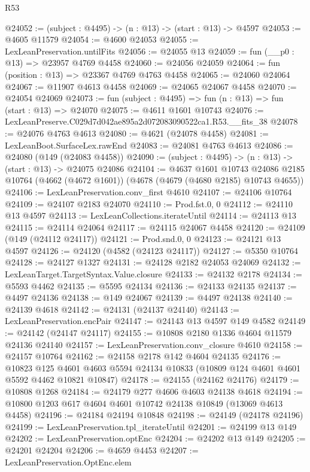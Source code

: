 \begin{lexlean}{R53}
\begin{coremodule}
@24052 := (subject : @4495) -> (n : @13) -> (start : @13) -> @4597
@24053 := @4605 @11579
@24054 := @4600 @24053
@24055 := LexLeanPreservation.untilFits
@24056 := @24055 @13
@24059 := fun (__p0 : @13) => @23957 @4769 @4458
@24060 := @24056 @24059
@24064 := fun (position : @13) => @23367 @4769 @4763 @4458
@24065 := @24060 @24064
@24067 := @11907 @4613 @4458
@24069 := @24065 @24067 @4458
@24070 := @24054 @24069
@24073 := fun (subject : @4495) => fun (n : @13) => fun (start : @13) => @24070
@24075 := @4611 @1601 @10743
@24076 := LexLeanPreserve.C029d7d042ae895a2d072083090522ca1.R53.__fits_38
@24078 := @24076 @4763 @4613
@24080 := @4621 (@24078 @4458)
@24081 := LexLeanBoot.SurfaceLex.rawEnd
@24083 := @24081 @4763 @4613
@24086 := @24080 (@149 (@24083 @4458))
@24090 := (subject : @4495) -> (n : @13) -> (start : @13) -> @24075 @24086
@24104 := @4637
    @1601
    @10743
    @24086
    @2185
    @10764
    (@4662 (@4672 @1601))
    (@4678 (@4679 (@4680 @2185) @10743 @4655))
@24106 := LexLeanPreservation.conv_first @4610
@24107 := @24106 @10764
@24109 := @24107 @2183 @24070
@24110 := Prod.fst.{0, 0}
@24112 := @24110 @13 @4597
@24113 := LexLeanCollections.iterateUntil
@24114 := @24113 @13
@24115 := @24114 @24064
@24117 := @24115 @24067 @4458
@24120 := @24109 (@149 (@24112 @24117))
@24121 := Prod.snd.{0, 0}
@24123 := @24121 @13 @4597
@24126 := @24120 (@4582 (@24123 @24117))
@24127 := @5350 @10764
@24128 := @24127 @1327
@24131 := @24128 @2182 @24053 @24069
@24132 := LexLeanTarget.TargetSyntax.Value.closure
@24133 := @24132 @2178
@24134 := @5593 @4462
@24135 := @5595 @24134
@24136 := @24133 @24135
@24137 := @4497 @24136
@24138 := @149 @24067
@24139 := @4497 @24138
@24140 := @24139 @4618
@24142 := @24131 (@24137 @24140)
@24143 := LexLeanPreservation.encPair
@24147 := @24143 @13 @4597 @149 @4582
@24149 := @24142 (@24147 @24117)
@24155 := @10808 @2180 @1336 @4604 @11579 @24136 @24140
@24157 := LexLeanPreservation.conv_closure @4610
@24158 := @24157 @10764
@24162 := @24158 @2178 @142 @4604 @24135
@24176 := @10823
    @125
    @4601
    @4603
    @5594
    @24134
    @10833
    (@10809 @124 @4601 @4601 @5592 @4462 @10821 @10847)
@24178 := @24155 (@24162 @24176)
@24179 := @10808 @1268
@24184 := @24179 @277 @4606 @4603 @24138 @4618
@24194 := @10800 @1203 @617 @4604 @4601 @10742 @24138 @10849 (@13069 @4613 @4458)
@24196 := @24184 @24194 @10848
@24198 := @24149 (@24178 @24196)
@24199 := LexLeanPreservation.tpl_iterateUntil
@24201 := @24199 @13 @149
@24202 := LexLeanPreservation.optEnc
@24204 := @24202 @13 @149
@24205 := @24201 @24204
@24206 := @4659 @4453
@24207 := LexLeanPreservation.OptEnc.elem

\end{coremodule}
\end{lexlean}
